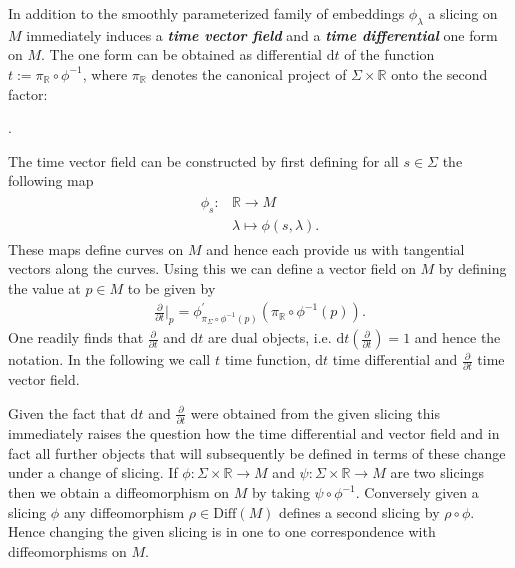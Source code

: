 \documentclass[a4paper,12pt, DIV=14, BCOR=5mm, twoside, headsepline]{scrbook}
\begin{document}
In addition to the smoothly parameterized family of embeddings $\phi_{\lambda}$ a slicing on $M$ immediately induces a \textit{\textbf{time vector field}} and a \textit{\textbf{time differential}} one form on $M$. The one form can be obtained as differential $\mathrm{d}t$ of the function $t:=\pi_{\mathbb{R}} \circ \phi^{-1}$, where $\pi_{\mathbb{R}}$ denotes the canonical project of $\Sigma \times \mathbb{R}$ onto the second factor: 
\begin{center}
 .
\end{center}
The time vector field can be constructed by first defining for all $s \in \Sigma$ the following map 
\begin{align}
\begin{aligned}
    \phi_s : &\mathbb{R} \longrightarrow M \\
    &\lambda \longmapsto \phi(s,\lambda).
\end{aligned}
\end{align}
These maps define curves on $M$ and hence each provide us with tangential vectors along the curves. Using this we can define a vector field on $M$ by defining the value at $p \in M$ to be given by
\begin{align}
\frac{\partial}{\partial t}\bigg \vert_p = \phi^{\prime}_{\pi_{\Sigma}\circ \phi^{-1}(p)} \left (\pi_{\mathbb{R}}\circ \phi^{-1}(p)\right ).
\end{align}
One readily finds that $\frac{\partial}{\partial t}$ and $\mathrm{d}t$ are dual objects, i.e. $\mathrm{d}t(\frac{\partial}{\partial t}) = 1$ and hence the notation. In the following we call $t$ time function, $\mathrm{d}t$ time differential and $\frac{\partial}{\partial t}$ time vector field.

Given the fact that $\mathrm{d}t$ and $\frac{\partial}{\partial t}$ were obtained from the given slicing this immediately raises the question how the time differential and vector field and in fact all further objects that will subsequently be defined in terms of these change under a change of slicing. If $\phi : \Sigma \times \mathbb{R} \rightarrow M $ and $\psi : \Sigma \times \mathbb{R} \rightarrow M$ are two slicings then we obtain a diffeomorphism on $M$ by taking $\psi \circ \phi^{-1}$. Conversely given a slicing $\phi$ any diffeomorphism $\rho \in \mathrm{Diff}(M)$ defines a second slicing by $\rho \circ \phi $. Hence changing the given slicing is in one to one correspondence with diffeomorphisms on $M$. \\
\end{document}
